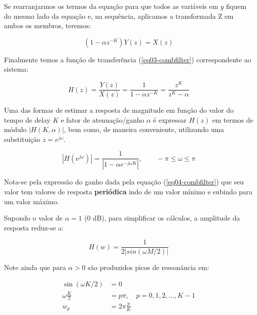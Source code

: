 		Se rearranjarmos os termos da equação para que todos as variáveis em $y$ fiquem do mesmo lado da equação e, na sequência, aplicamos a transformada Z em ambos os membros, teremos:
		
		\begin{equation}
			\label{eq02-combfilter}
			(1-\alpha z^{-K})Y(z) = X(z)
		\end{equation}
		
		Finalmente temos a função de transferência (\ref{eq03-combfilter}) correspondente ao sistema:
		
		\begin{equation}
			\label{eq03-combfilter}
			H(z) = \frac{Y(z)}{X(z)} = \frac{1}{1-\alpha z^{-K}} = \frac{z^K}{z^K-\alpha}
		\end{equation}
		
		Uma das formas de estimar a resposta de magnitude em função do valor do tempo de delay $K$ e fator de atenuação/ganho $\alpha$ é expressar $ H(z) $ em termos de módulo $|H(K,\alpha)|$, bem como, de maneira conveniente, utilizando uma substituição $ z = e^{j\omega} $.
		
		\begin{equation}
			|H(e^{j\omega})| = \frac{1}{|1-\alpha e^{-j\omega K}|},
			\qquad
			-\pi\leq \omega \leq \pi
			\label{eq04-combfilter}
		\end{equation}
		
		Nota-se pela expressão do ganho dada pela equação (\ref{eq04-combfilter}) que seu valor tem valores de resposta \textbf{periódica} indo de um valor mínimo e subindo para um valor máximo.
		
		Supondo o valor de $\alpha = 1$ ($0$ dB), para simplificar os cálculos, a amplitude da resposta reduz-se a:
		
		\begin{equation}
			\label{eq05-combfilter}
			H(w) = \frac{1}{2|sin(\omega M/2)|}
		\end{equation}

		Note ainda que para $\alpha > 0$ são produzidos picos de ressonância em:
		
		\begin{equation}
			\begin{aligned}
				\sin(\omega K/2) &= 0 \\
				\omega \frac{K}{2} &= p\pi,\quad p=0,1,2,...,K-1\\
				w_p &= 2\pi\frac{p}{K}
			\end{aligned}
		\end{equation}
		
